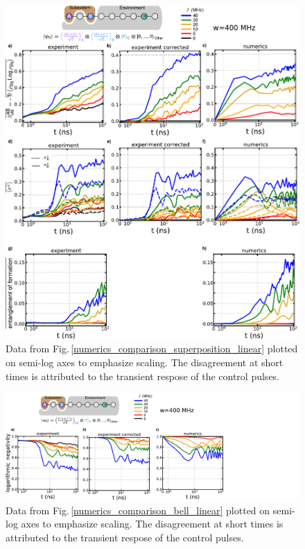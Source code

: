 \begin{figure}
\centering
\includegraphics[width=140mm, keepaspectratio]{./PDF/dat_cor_num_superposition_log.pdf}
\caption{Data from Fig.\,\ref{numerics_comparison_superposition_linear} plotted on semi-log axes to emphasize scaling.  The disagreement at short times is attributed to the transient respose of the control pulses.}
\label{numerics_comparison_superposition_log}
\end{figure}

\begin{figure}
\centering
\hspace*{10mm}
\includegraphics[width=195mm, keepaspectratio]{./PDF/dat_cor_num_bell_log.pdf}
\caption{Data from Fig.\,\ref{numerics_comparison_bell_linear} plotted on semi-log axes to emphasize scaling.  The disagreement at short times is attributed to the transient respose of the control pulses.}
\label{numerics_comparison_bell_log}
\end{figure}

